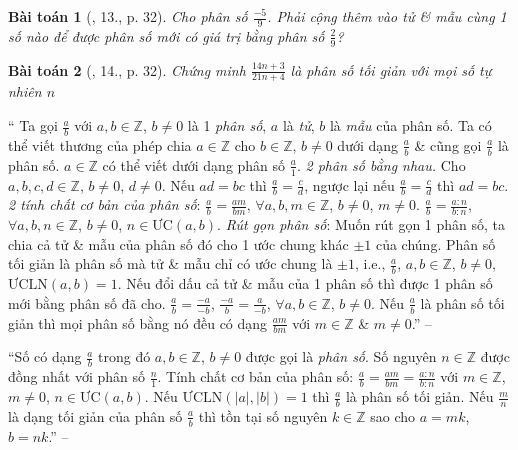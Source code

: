 \documentclass{article}
\newtheorem{baitoan}{Bài toán}
\begin{document}
\begin{baitoan}[\cite{SBT_Toan_6_Canh_Dieu_tap_2}, 13., p. 32]
	Cho phân số $\frac{-5}{9}$. Phải cộng thêm vào tử \& mẫu cùng 1 số nào để được phân số mới có giá trị bằng phân số $\frac{2}{9}$?
\end{baitoan}

\begin{baitoan}[\cite{SBT_Toan_6_Canh_Dieu_tap_2}, 14., p. 32]
	Chứng minh $\frac{14n + 3}{21n + 4}$ là phân số  tối giản với mọi số tự nhiên $n$
\end{baitoan}
\noindent`` Ta gọi $\frac{a}{b}$ với $a,b\in\mathbb{Z}$, $b\ne0$ là 1 \textit{phân số}, $a$ là \textit{tử}, $b$ là \textit{mẫu} của phân số. Ta có thể viết thương của phép chia $a\in\mathbb{Z}$ cho $b\in\mathbb{Z}$, $b\ne 0$ dưới dạng $\frac{a}{b}$ \& cũng gọi $\frac{a}{b}$ là phân số. $a\in\mathbb{Z}$ có thể viết dưới dạng phân số $\frac{a}{1}$.  \textit{2 phân số bằng nhau.} Cho $a,b,c,d\in\mathbb{Z}$, $b\ne0$, $d\ne 0$. Nếu $ad = bc$ thì $\frac{a}{b} = \frac{c}{d}$, ngược lại nếu $\frac{a}{b} = \frac{c}{d}$ thì $ad = bc$.  \textit{2 tính chất cơ bản của phân số}: $\frac{a}{b} = \frac{am}{bm}$, $\forall a,b,m\in\mathbb{Z}$, $b\ne0$, $m\ne0$. $\frac{a}{b} = \frac{a:n}{b:n}$, $\forall a,b,n\in\mathbb{Z}$, $b\ne0$, $n\in\mbox{ƯC}(a,b)$.  \textit{Rút gọn phân số}: Muốn rút gọn 1 phân số, ta chia cả tử \& mẫu của phân số đó cho 1 ước chung khác $\pm1$ của chúng. Phân số tối giản là phân số mà tử \& mẫu chỉ có ước chung là $\pm1$, i.e., $\frac{a}{b}$, $a,b\in\mathbb{Z}$, $b\ne0$, $\mbox{ƯCLN}(a,b) = 1$.  Nếu đổi dấu cả tử \& mẫu của 1 phân số thì được 1 phân số mới bằng phân số đã cho. $\frac{a}{b} = \frac{-a}{-b}$, $\frac{-a}{b} = \frac{a}{-b}$, $\forall a,b\in\mathbb{Z}$, $b\ne0$.  Nếu $\frac{a}{b}$ là phân số tối giản thì mọi phân số bằng nó đều có dạng $\frac{am}{bm}$ với $m\in\mathbb{Z}$ \& $m\ne0$.'' -- \cite[Chap. 3, \S1, p. 45]{Tuyen_Toan_6}

``Số có dạng $\frac{a}{b}$ trong đó $a,b\in\mathbb{Z}$, $b\ne0$ được gọi là \textit{phân số}. Số nguyên $n\in\mathbb{Z}$ được đồng nhất với phân số $\frac{n}{1}$. Tính chất cơ bản của phân số: $\frac{a}{b} = \frac{am}{bm} = \frac{a:n}{b:n}$ với $m\in\mathbb{Z}$, $m\ne0$, $n\in\mbox{ƯC}(a,b)$. Nếu $\mbox{ƯCLN}(|a|,|b|) = 1$ thì $\frac{a}{b}$ là phân số tối giản. Nếu $\frac{m}{n}$ là dạng tối giản của phân số $\frac{a}{b}$ thì tồn tại số nguyên $k\in\mathbb{Z}$ sao cho $a = mk$, $b = nk$.'' -- \cite[Chap. III, \S1, p. 4]{Binh_Toan_6_tap_2}
\end{document}
